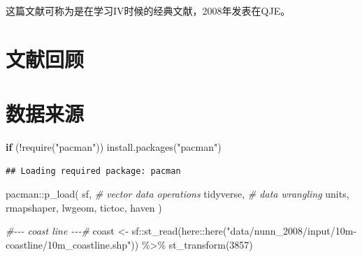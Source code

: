 \documentclass[
  oneside]{book}
\newenvironment{Shaded}{\begin{snugshade}}{\end{snugshade}}
\newcommand{\CommentTok}[1]{\textcolor[rgb]{0.56,0.35,0.01}{\textit{#1}}}
\newcommand{\ControlFlowTok}[1]{\textcolor[rgb]{0.13,0.29,0.53}{\textbf{#1}}}
\newcommand{\DecValTok}[1]{\textcolor[rgb]{0.00,0.00,0.81}{#1}}
\newcommand{\FunctionTok}[1]{\textcolor[rgb]{0.00,0.00,0.00}{#1}}
\newcommand{\NormalTok}[1]{#1}
\newcommand{\OtherTok}[1]{\textcolor[rgb]{0.56,0.35,0.01}{#1}}
\newcommand{\SpecialCharTok}[1]{\textcolor[rgb]{0.00,0.00,0.00}{#1}}
\newcommand{\StringTok}[1]{\textcolor[rgb]{0.31,0.60,0.02}{#1}}
\begin{document}
\textcite{Nunn2008} 这篇文献可称为是在学习IV时候的经典文献，2008年发表在QJE。

\hypertarget{ux6587ux732eux56deux987e-1}{%
\section{文献回顾}\label{ux6587ux732eux56deux987e-1}}

\hypertarget{ux6570ux636eux6765ux6e90}{%
\section{数据来源}\label{ux6570ux636eux6765ux6e90}}

\begin{Shaded}
\begin{Highlighting}[]
\ControlFlowTok{if}\NormalTok{ (}\SpecialCharTok{!}\FunctionTok{require}\NormalTok{(}\StringTok{"pacman"}\NormalTok{)) }\FunctionTok{install.packages}\NormalTok{(}\StringTok{"pacman"}\NormalTok{)}
\end{Highlighting}
\end{Shaded}

\begin{verbatim}
## Loading required package: pacman
\end{verbatim}

\begin{Shaded}
\begin{Highlighting}[]
\NormalTok{pacman}\SpecialCharTok{::}\FunctionTok{p\_load}\NormalTok{(}
\NormalTok{  sf, }\CommentTok{\# vector data operations}
\NormalTok{  tidyverse, }\CommentTok{\# data wrangling}
\NormalTok{  units,}
\NormalTok{  rmapshaper,}
\NormalTok{  lwgeom,}
\NormalTok{  tictoc,}
\NormalTok{  haven}
\NormalTok{)}
\end{Highlighting}
\end{Shaded}

\begin{Shaded}
\begin{Highlighting}[]
\CommentTok{\#{-}{-}{-} coast line {-}{-}{-}\#}
\NormalTok{coast }\OtherTok{\textless{}{-}}
\NormalTok{  sf}\SpecialCharTok{::}\FunctionTok{st\_read}\NormalTok{(here}\SpecialCharTok{::}\FunctionTok{here}\NormalTok{(}\StringTok{"data/nunn\_2008/input/10m{-}coastline/10m\_coastline.shp"}\NormalTok{)) }\SpecialCharTok{\%\textgreater{}\%}
  \FunctionTok{st\_transform}\NormalTok{(}\DecValTok{3857}\NormalTok{)}
\end{Highlighting}
\end{Shaded}
\end{document}
